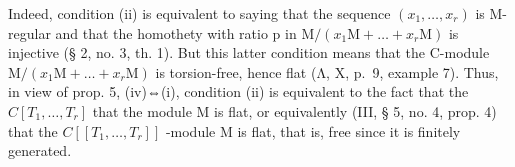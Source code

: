 \begin{enumerate}
Indeed, condition (ii) is equivalent to saying that the sequence \((x_{1},\ldots,x_{r})\) is M-regular and that the homothety with ratio p in \(\mathrm{M}/(x_{1}\mathrm{M}+\ldots+x_{r}\mathrm{M})\) is injective (§ 2, no. 3, th. 1). But this latter condition means that the C-module \(\mathrm{M}/(x_{1}\mathrm{M}+\ldots+x_{r}\mathrm{M})\) is torsion-free, hence flat (Λ, X, p.~9, example 7). Thus, in view of prop. 5, (iv)⇔(i), condition (ii) is equivalent to the fact that the \(C[T_{1},\ldots,T_{r}]\) that the module M is flat, or equivalently (III, § 5, no. 4, prop. 4) that the \(C[[T_{1},\ldots,T_{r}]]\) -module M is flat, that is, free since it is finitely generated.

\end{enumerate}

